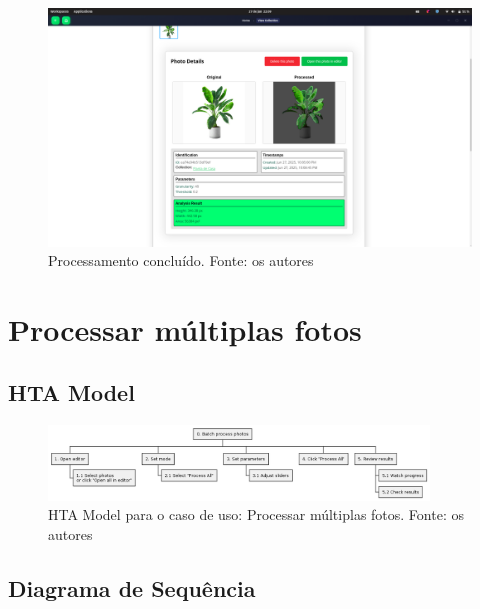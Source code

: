 \begin{figure}[H]
    \centering
    \includegraphics[width=1\textwidth]{../figures/screens/uc011/Screenshot from 2025-06-27 22-09-06.png}
    \caption{Processamento concluído. Fonte: os autores}
    \label{fig:uc011-screen7}
\end{figure}

\section{Processar múltiplas fotos}

\subsection{HTA Model}

\begin{figure}[H]
    \centering
    \includegraphics[width=0.9\textwidth]{../figures/hta/UC012.png}
    \caption{HTA Model para o caso de uso: Processar múltiplas fotos. Fonte: os autores}
    \label{fig:hta-uc012}
\end{figure}

\subsection{Diagrama de Sequência}

